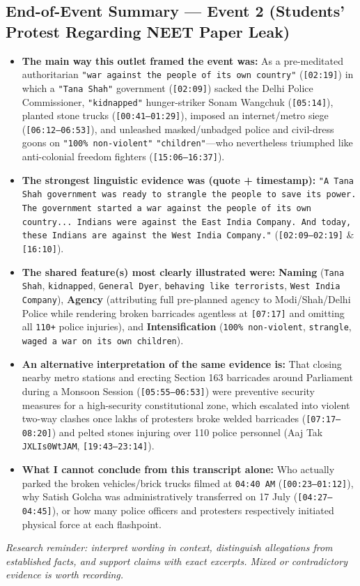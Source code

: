 \documentclass[10pt,a4paper]{article}
\begin{document}
\subsection*{End-of-Event Summary --- Event 2 (Students' Protest Regarding NEET Paper Leak)}
\begin{itemize}[leftmargin=1.5em, itemsep=3pt, topsep=4pt]
  \item \textbf{The main way this outlet framed the event was:} As a pre-meditated authoritarian \texttt{"war against the people of its own country"} (\texttt{[02:19]}) in which a \texttt{"Tana Shah"} government (\texttt{[02:09]}) sacked the Delhi Police Commissioner, \texttt{"kidnapped"} hunger-striker Sonam Wangchuk (\texttt{[05:14]}), planted stone trucks (\texttt{[00:41--01:29]}), imposed an internet/metro siege (\texttt{[06:12--06:53]}), and unleashed masked/unbadged police and civil-dress goons on \texttt{"100\% non-violent"} \texttt{"children"}---who nevertheless triumphed like anti-colonial freedom fighters (\texttt{[15:06--16:37]}).
  \item \textbf{The strongest linguistic evidence was (quote + timestamp):} \texttt{"A Tana Shah government was ready to strangle the people to save its power. The government started a war against the people of its own country... Indians were against the East India Company. And today, these Indians are against the West India Company."} (\texttt{[02:09--02:19]} \& \texttt{[16:10]}).
  \item \textbf{The shared feature(s) most clearly illustrated were:} \textbf{Naming} (\texttt{Tana Shah}, \texttt{kidnapped}, \texttt{General Dyer}, \texttt{behaving like terrorists}, \texttt{West India Company}), \textbf{Agency} (attributing full pre-planned agency to Modi/Shah/Delhi Police while rendering broken barricades agentless at \texttt{[07:17]} and omitting all \texttt{110+} police injuries), and \textbf{Intensification} (\texttt{100\% non-violent}, \texttt{strangle}, \texttt{waged a war on its own children}).
  \item \textbf{An alternative interpretation of the same evidence is:} That closing nearby metro stations and erecting Section 163 barricades around Parliament during a Monsoon Session (\texttt{[05:55--06:53]}) were preventive security measures for a high-security constitutional zone, which escalated into violent two-way clashes once lakhs of protesters broke welded barricades (\texttt{[07:17--08:20]}) and pelted stones injuring over 110 police personnel (Aaj Tak \texttt{JXLIs0WtJAM}, \texttt{[19:43--23:14]}).
  \item \textbf{What I cannot conclude from this transcript alone:} Who actually parked the broken vehicles/brick trucks filmed at \texttt{04:40 AM} (\texttt{[00:23--01:12]}), why Satish Golcha was administratively transferred on 17 July (\texttt{[04:27--04:45]}), or how many police officers and protesters respectively initiated physical force at each flashpoint.
\end{itemize}
\textit{Research reminder: interpret wording in context, distinguish allegations from established facts, and support claims with exact excerpts. Mixed or contradictory evidence is worth recording.}
\end{document}
